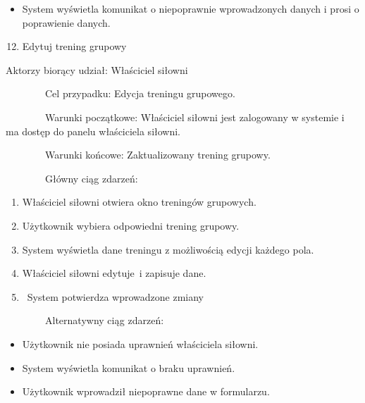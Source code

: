 \documentclass[
]{article}
\providecommand{\tightlist}{%
  \setlength{\itemsep}{0pt}\setlength{\parskip}{0pt}}
\begin{document}
\begin{itemize}
\tightlist
\item
  {System wyświetla komunikat o niepoprawnie wprowadzonych danych i
  prosi o poprawienie danych.}
\end{itemize}

{}

\begin{enumerate}
\setcounter{enumi}{11}
\tightlist
\item
  {Edytuj trening grupowy}
\end{enumerate}

{Aktorzy biorący udział: Właściciel siłowni}

{~~~~~~~~Cel przypadku: Edycja treningu grupowego.}

{~~~~~~~~Warunki początkowe: Właściciel siłowni jest zalogowany w
systemie i ma dostęp do panelu właściciela siłowni.}

{~~~~~~~~Warunki końcowe: Zaktualizowany trening grupowy.}

{~~~~~~~~Główny ciąg zdarzeń:}

\begin{enumerate}
\tightlist
\item
  {Właściciel siłowni otwiera okno treningów grupowych.}
\item
  {Użytkownik wybiera odpowiedni trening grupowy.}
\item
  {System wyświetla dane treningu z możliwością edycji każdego pola.}
\item
  {Właściciel siłowni }{edytuje}{~i zapisuje dane.}
\item
  {~System potwierdza wprowadzone zmiany}
\end{enumerate}

{~~~~~~~~Alternatywny ciąg zdarzeń:}

\begin{itemize}
\tightlist
\item
  {Użytkownik nie posiada uprawnień właściciela siłowni.}
\end{itemize}

\begin{itemize}
\tightlist
\item
  {System wyświetla komunikat o braku uprawnień.}
\end{itemize}

\begin{itemize}
\tightlist
\item
  {Użytkownik wprowadził niepoprawne dane w formularzu.}
\end{itemize}
\end{document}
